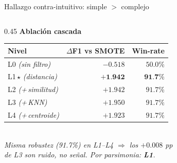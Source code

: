 \begin{frame}{Hallazgo contra-intuitivo: simple $>$ complejo}
\begin{columns}[T]
\begin{column}{0.45\textwidth}
\centering
{\scriptsize\textbf{Ablación cascada} }\\[6pt]
{\scriptsize
\setlength{\tabcolsep}{7pt}
\renewcommand{\arraystretch}{1.15}
\begin{tabular}{@{}lrr@{}}
\toprule
\textbf{Nivel} & \textbf{$\Delta$F1 vs SMOTE} & \textbf{Win-rate} \\
\midrule
L0 \textit{\textcolor{uaigray!85}{(sin filtro)}}      & $-0{.}518$ & $50{.}0\%$ \\
\rowcolor{uaigreen!12}
L1\,\alert{$\star$} \textit{\textcolor{uaigray!85}{(distancia)}}   & \alert{$\boldsymbol{+1{.}942}$} & \alert{$\boldsymbol{91{.}7\%}$} \\
L2 \textit{\textcolor{uaigray!85}{(+\,similitud)}}     & $+1{.}942$ & $91{.}7\%$ \\
L3 \textit{\textcolor{uaigray!85}{(+\,KNN)}}           & $+1{.}950$ & $91{.}7\%$ \\
L4 \textit{\textcolor{uaigray!85}{(+\,centroide)}}     & $+1{.}923$ & $91{.}7\%$ \\
\bottomrule
\end{tabular}}\\[4pt]
{\tiny\itshape Misma robustez (91.7\%) en L1--L4 $\Rightarrow$ los $+0{.}008$ pp\\
de L3 son ruido, no señal. Por parsimonia: \textbf{L1}.}
\end{column}

\end{columns}
\end{frame}

